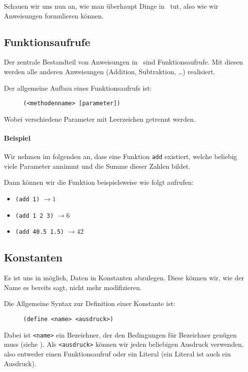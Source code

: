 Schauen wir uns nun an, wie man überhaupt Dinge in \racketText\, tut, also wie wir Anweisungen formulieren können.

\subsection{Funktionsaufrufe}
	
	Der zentrale Bestandteil von Anweisungen in \racketText\, sind Funktionsaufrufe. Mit diesen werden alle anderen Anweisungen (Addition, Subtraktion, \dots) realisiert.
	
	Der allgemeine Aufbau eines Funktionsaufrufs ist:
	\begin{figure}[H]
		\centering
		\lstinline[language = Racket]|(<methodenname> [parameter])|
	\end{figure}
	Wobei verschiedene Parameter mit Leerzeichen getrennt werden.
	
	\paragraph{Beispiel}
		Wir nehmen im folgenden an, dass eine Funktion \texttt{add} existiert, welche beliebig viele Parameter annimmt und die Summe dieser Zahlen bildet.
		
		Dann können wir die Funktion beispielsweise wie folgt aufrufen:
		\begin{itemize}
			\item \lstinline[language = Racket]|(add 1)|		\tabto{3cm} \(\rightarrow 1\)
			\item \lstinline[language = Racket]|(add 1 2 3)|    \tabto{3cm} \(\rightarrow 6\)
			\item \lstinline[language = Racket]|(add 40.5 1.5)| \tabto{3cm} \(\rightarrow 42\)
		\end{itemize}

\subsection{Konstanten}
	
	Es ist uns in \racketText möglich, Daten in Konstanten abzulegen. Diese können wir, wie der Name es bereits sagt, nicht mehr modifizieren.
	
	Die Allgemeine Syntax zur Definition einer Konstante ist:
	\begin{figure}[H]
		\centering
		\lstinline[language = Racket]|(define <name> <ausdruck>)|
	\end{figure}
	Dabei ist \texttt{<name>} ein Bezeichner, der den Bedingungen für Bezeichner genügen muss (siehe ). Als \texttt{<ausdruck>} können wir jeden beliebigen Ausdruck verwenden, also entweder einen Funktionsaufruf oder ein Literal (ein Literal ist auch ein Ausdruck).
	
